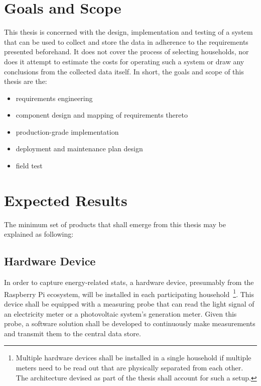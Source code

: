 \documentclass[11pt,a4paper]{article}
\begin{document}
\section{Goals and Scope}


This thesis is concerned with the design, implementation and testing of a system that can be used to collect and store the data in adherence to the requirements presented beforehand. It does not cover the process of selecting households, nor does it attempt to estimate the costs for operating such a system or draw any conclusions from the collected data itself. In short, the goals and scope of this thesis are the:

\begin{itemize}
  \item requirements engineering
  \item component design and mapping of requirements thereto
  \item production-grade implementation
  \item deployment and maintenance plan design
  \item field test
\end{itemize}


\section{Expected Results}

The minimum set of products that shall emerge from this thesis may be explained as following:

\subsection{Hardware Device}

In order to capture energy-related stats, a hardware device, presumably from the Raspberry Pi ecosystem, will be installed in each participating household~\footnote{Multiple hardware devices shall be installed in a single household if multiple meters need to be read out that are physically separated from each other. The architecture devised as part of the thesis shall account for such a setup.}. This device shall be equipped with a measuring probe that can read the light signal of an electricity meter or a photovoltaic system's generation meter. Given this probe, a software solution shall be developed to continuously make measurements and transmit them to the central data store. 
\end{document}
